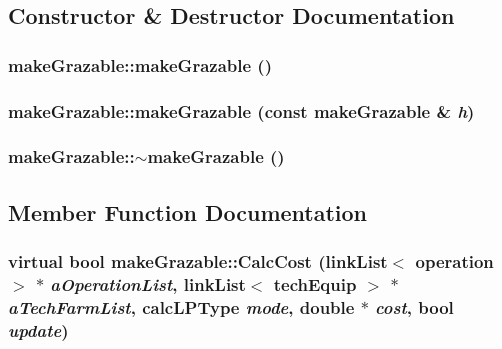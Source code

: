 \subsection{Constructor \& Destructor Documentation}
\hypertarget{classmake_grazable_ad90284cb8309bbbd8d2fb8c1337380fa}{
\subsubsection[{makeGrazable}]{\setlength{\rightskip}{0pt plus 5cm}makeGrazable::makeGrazable ()}}
\label{classmake_grazable_ad90284cb8309bbbd8d2fb8c1337380fa}
\hypertarget{classmake_grazable_a0bb2b0d5484d9f7a0b606f12f514cb81}{
\subsubsection[{makeGrazable}]{\setlength{\rightskip}{0pt plus 5cm}makeGrazable::makeGrazable (const {\bf makeGrazable} \& {\em h})}}
\label{classmake_grazable_a0bb2b0d5484d9f7a0b606f12f514cb81}
\hypertarget{classmake_grazable_a415545fca903e5017402c2f40d482e14}{
\subsubsection[{$\sim$makeGrazable}]{\setlength{\rightskip}{0pt plus 5cm}makeGrazable::$\sim$makeGrazable ()}}
\label{classmake_grazable_a415545fca903e5017402c2f40d482e14}


\subsection{Member Function Documentation}
\hypertarget{classmake_grazable_ae09405366070332941b95c92b334c6c1}{
\subsubsection[{CalcCost}]{\setlength{\rightskip}{0pt plus 5cm}virtual bool makeGrazable::CalcCost ({\bf linkList}$<$ {\bf operation} $>$ $\ast$ {\em aOperationList}, \/  {\bf linkList}$<$ {\bf techEquip} $>$ $\ast$ {\em aTechFarmList}, \/  {\bf calcLPType} {\em mode}, \/  double $\ast$ {\em cost}, \/  bool {\em update})}}
\label{classmake_grazable_ae09405366070332941b95c92b334c6c1}


